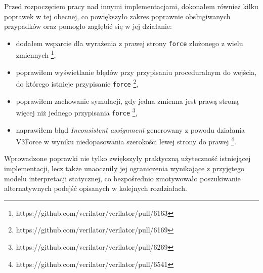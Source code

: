 \documentclass[shortabstract, inz]{iithesis}
\begin{document}
Przed rozpoczęciem pracy nad innymi implementacjami, dokonałem również kilku poprawek w tej obecnej, co powiększyło zakres poprawnie obsługiwanych przypadków oraz pomogło zagłębić się w jej działanie:
\begin{itemize}
    \item dodałem wsparcie dla wyrażenia z prawej strony \texttt{force} złożonego z wielu zmiennych \footnote{https://github.com/verilator/verilator/pull/6163},
    \item poprawiłem wyświetlanie błędów przy przypisaniu proceduralnym do wejścia, do którego istnieje przypisanie \texttt{force} \footnote{https://github.com/verilator/verilator/pull/6169},
    \item poprawiłem zachowanie symulacji, gdy jedna zmienna jest prawą stroną więcej niż jednego przypisania \texttt{force} \footnote{https://github.com/verilator/verilator/pull/6269},
    \item naprawiłem błąd \textit{Inconsistent assignment} generowany z powodu działania V3Force w wyniku niedopasowania szerokości lewej strony do prawej \footnote{https://github.com/verilator/verilator/pull/6541}.
\end{itemize}

Wprowadzone poprawki nie tylko zwiększyły praktyczną użyteczność istniejącej implementacji, lecz także unaoczniły jej ograniczenia wynikające z przyjętego modelu interpretacji statycznej, co bezpośrednio zmotywowało poszukiwanie alternatywnych podejść opisanych w kolejnych rozdziałach.
\end{document}
